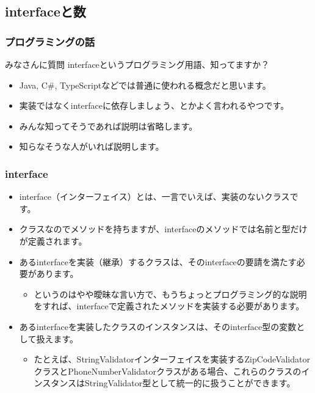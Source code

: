\documentclass[dvipdfmx]{beamer}
\begin{document}
  \subsection{interfaceと数}

  \begin{frame}
    \frametitle{プログラミングの話}

    \begin{block}{みなさんに質問}
      interfaceというプログラミング用語、知ってますか？
    \end{block}

    \begin{itemize}
      \item Java, C\#, TypeScriptなどでは普通に使われる概念だと思います。
      \item 実装ではなくinterfaceに依存しましょう、とかよく言われるやつです。
      \item みんな知ってそうであれば説明は省略します。
      \item 知らなそうな人がいれば説明します。
    \end{itemize}

  \end{frame}

  \begin{frame}
    \frametitle{interface}

    \begin{itemize}
      \item interface（インターフェイス）とは、一言でいえば、実装のないクラスです。
      \item クラスなのでメソッドを持ちますが、interfaceのメソッドでは名前と型だけが定義されます。
      \item あるinterfaceを実装（継承）するクラスは、そのinterfaceの要請を満たす必要があります。
      \begin{itemize}
        \item というのはやや曖昧な言い方で、もうちょっとプログラミング的な説明をすれば、interfaceで定義されたメソッドを実装する必要があります。
      \end{itemize}
      \item あるinterfaceを実装したクラスのインスタンスは、そのinterface型の変数として扱えます。
      \begin{itemize}
        \item たとえば、StringValidatorインターフェイスを実装するZipCodeValidatorクラスとPhoneNumberValidatorクラスがある場合、これらのクラスのインスタンスはStringValidator型として統一的に扱うことができます。
      \end{itemize}
    \end{itemize}

  \end{frame}
\end{document}
